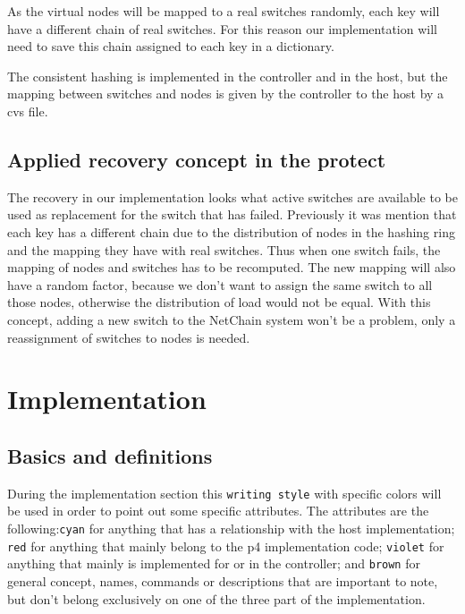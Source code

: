 \documentclass[11pt,oneside,a4paper]{article}
\begin{document}
As the virtual nodes will be mapped to a real switches randomly, each key will have a different chain of real switches. For this reason our implementation will need to save this chain assigned to each key in a dictionary.  

The consistent hashing is implemented in the controller and in the host, but the mapping between switches and nodes is given by the controller to the host by a cvs file.

\subsection{Applied recovery concept in the protect}

The recovery in our implementation looks what active switches are available to be used as replacement for the switch that has failed. Previously it was mention that each key has a different chain due to the distribution of nodes in the hashing ring and the mapping they have with real switches. Thus when one switch fails, the mapping of nodes and switches has to be recomputed. The new mapping will also have a random factor, because we don't want to assign the same switch to all those nodes, otherwise the distribution of load would not be equal. With this concept, adding a new switch to the NetChain system won't be a problem, only a reassignment of switches to nodes is needed.  

\section{Implementation}

\subsection{Basics and definitions}

During the implementation section this {\color{black}\texttt{writing style}} with specific colors will be used in order to point out some specific attributes. The attributes are the following:{\color{cyan}\texttt{cyan}} for anything that has a relationship with the host implementation; {\color{red}\texttt{red}} for anything that mainly belong to the p4 implementation code; {\color{violet}\texttt{violet}} for anything that mainly is implemented for or in the controller; and {\color{brown}\texttt{brown}} for  general concept, names, commands or descriptions that are important to note, but don't belong exclusively on one of the three part of the implementation.
\end{document}
